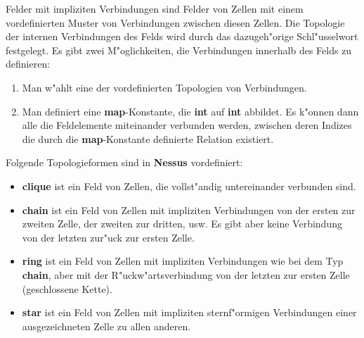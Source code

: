 Felder mit impliziten Verbindungen sind
Felder von Zellen mit einem vordefinierten Muster von Verbindungen
zwischen diesen Zellen. Die Topologie der internen Verbindungen des
Felds wird durch das dazugeh"orige Schl"usselwort festgelegt. Es gibt
zwei M"oglichkeiten, die Verbindungen innerhalb des Felds zu
definieren:

\begin{enumerate}
\item Man w"ahlt eine der vordefinierten Topologien von
Verbindungen. 

\item Man definiert eine {\bf map}-Konstante, die {\bf
int}  auf {\bf int} abbildet. Es k"onnen dann alle die
Feldelemente miteinander verbunden werden, zwischen deren Indizes die
durch die {\bf map}-Konstante definierte
Relation existiert.
\end{enumerate}

Folgende  Topologieformen sind in  {\bf Nessus} vordefiniert:

\begin{itemize} 
  
\item {\bf clique} ist ein Feld von Zellen, die
vollst"andig untereinander verbunden sind.
  
\item {\bf chain} ist ein Feld von Zellen mit
impliziten Verbindungen von der ersten zur zweiten
Zelle, der zweiten zur dritten, usw. Es gibt aber keine Verbindung von
der letzten zur"uck zur ersten Zelle.

\item {\bf ring} ist ein Feld von Zellen mit
impliziten Verbindungen wie bei dem Typ {\bf chain}, aber
mit der R"uckw"artsverbindung von der letzten zur ersten Zelle
(geschlossene Kette).
  
\item {\bf star} ist ein Feld von Zellen mit impliziten
sternf"ormigen Verbindungen einer ausgezeichneten
Zelle zu allen anderen.
\end{itemize}

